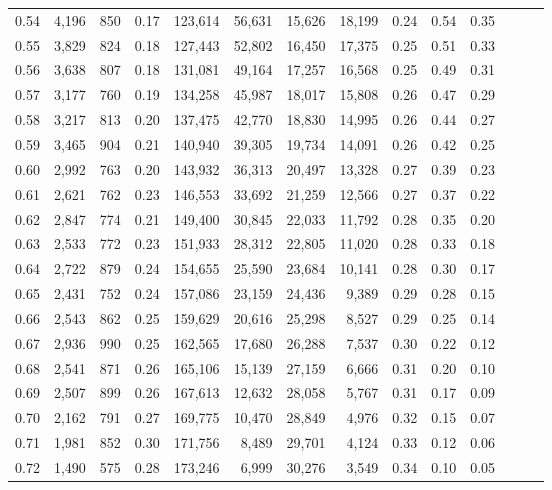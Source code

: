 \begin{tabular}{rrrrrrrrrrrrrr}
0.54 &  4,196 &  850 &  0.17 &  123,614 &   56,631 &  15,626 &  18,199 &  0.24 &  0.54 &      0.35 \\
0.55 &  3,829 &  824 &  0.18 &  127,443 &   52,802 &  16,450 &  17,375 &  0.25 &  0.51 &      0.33 \\
0.56 &  3,638 &  807 &  0.18 &  131,081 &   49,164 &  17,257 &  16,568 &  0.25 &  0.49 &      0.31 \\
0.57 &  3,177 &  760 &  0.19 &  134,258 &   45,987 &  18,017 &  15,808 &  0.26 &  0.47 &      0.29 \\
0.58 &  3,217 &  813 &  0.20 &  137,475 &   42,770 &  18,830 &  14,995 &  0.26 &  0.44 &      0.27 \\
0.59 &  3,465 &  904 &  0.21 &  140,940 &   39,305 &  19,734 &  14,091 &  0.26 &  0.42 &      0.25 \\
0.60 &  2,992 &  763 &  0.20 &  143,932 &   36,313 &  20,497 &  13,328 &  0.27 &  0.39 &      0.23 \\
0.61 &  2,621 &  762 &  0.23 &  146,553 &   33,692 &  21,259 &  12,566 &  0.27 &  0.37 &      0.22 \\
0.62 &  2,847 &  774 &  0.21 &  149,400 &   30,845 &  22,033 &  11,792 &  0.28 &  0.35 &      0.20 \\
0.63 &  2,533 &  772 &  0.23 &  151,933 &   28,312 &  22,805 &  11,020 &  0.28 &  0.33 &      0.18 \\
0.64 &  2,722 &  879 &  0.24 &  154,655 &   25,590 &  23,684 &  10,141 &  0.28 &  0.30 &      0.17 \\
0.65 &  2,431 &  752 &  0.24 &  157,086 &   23,159 &  24,436 &   9,389 &  0.29 &  0.28 &      0.15 \\
0.66 &  2,543 &  862 &  0.25 &  159,629 &   20,616 &  25,298 &   8,527 &  0.29 &  0.25 &      0.14 \\
0.67 &  2,936 &  990 &  0.25 &  162,565 &   17,680 &  26,288 &   7,537 &  0.30 &  0.22 &      0.12 \\
0.68 &  2,541 &  871 &  0.26 &  165,106 &   15,139 &  27,159 &   6,666 &  0.31 &  0.20 &      0.10 \\
0.69 &  2,507 &  899 &  0.26 &  167,613 &   12,632 &  28,058 &   5,767 &  0.31 &  0.17 &      0.09 \\
0.70 &  2,162 &  791 &  0.27 &  169,775 &   10,470 &  28,849 &   4,976 &  0.32 &  0.15 &      0.07 \\
0.71 &  1,981 &  852 &  0.30 &  171,756 &    8,489 &  29,701 &   4,124 &  0.33 &  0.12 &      0.06 \\
0.72 &  1,490 &  575 &  0.28 &  173,246 &    6,999 &  30,276 &   3,549 &  0.34 &  0.10 &      0.05 \\

\end{tabular}
